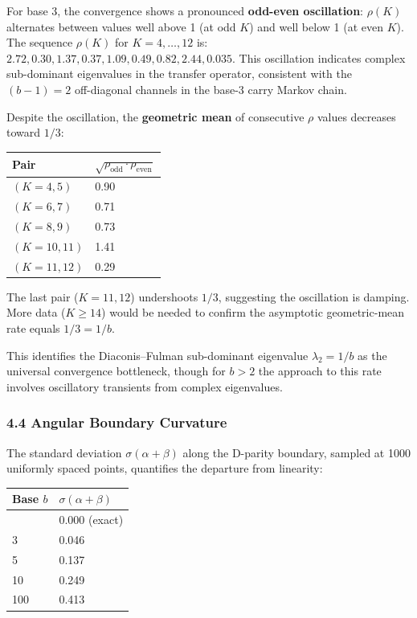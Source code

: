 \documentclass[
  11pt,
]{article}
\begin{document}
For base 3, the convergence shows a pronounced \textbf{odd-even oscillation}:
\(\rho(K)\) alternates between values well above 1 (at odd \(K\)) and well below
1 (at even \(K\)). The sequence \(\rho(K)\) for \(K = 4, \ldots, 12\) is:
\(2.72, 0.30, 1.37, 0.37, 1.09, 0.49, 0.82, 2.44, 0.035\). This oscillation
indicates complex sub-dominant eigenvalues in the transfer operator, consistent
with the \((b-1) = 2\) off-diagonal channels in the base-3 carry Markov chain.

Despite the oscillation, the \textbf{geometric mean} of consecutive \(\rho\)
values decreases toward \(1/3\):

\begin{longtable}[]{@{}ll@{}}
\toprule\noalign{}
Pair & \(\sqrt{\rho_{\text{odd}} \cdot \rho_{\text{even}}}\) \\
\midrule\noalign{}
\endhead
\bottomrule\noalign{}
\endlastfoot
\((K=4,5)\) & 0.90 \\
\((K=6,7)\) & 0.71 \\
\((K=8,9)\) & 0.73 \\
\((K=10,11)\) & 1.41 \\
\((K=11,12)\) & 0.29 \\
\end{longtable}

The last pair (\(K = 11, 12\)) undershoots \(1/3\), suggesting the oscillation
is damping. More data (\(K \geq 14\)) would be needed to confirm the asymptotic
geometric-mean rate equals \(1/3 = 1/b\).

This identifies the Diaconis--Fulman sub-dominant eigenvalue \(\lambda_2 = 1/b\)
as the universal convergence bottleneck, though for \(b > 2\) the approach to
this rate involves oscillatory transients from complex eigenvalues.

\subsubsection{4.4 Angular Boundary Curvature}\label{angular-boundary-curvature}

The standard deviation \(\sigma(\alpha + \beta)\) along the D-parity boundary,
sampled at 1000 uniformly spaced points, quantifies the departure from
linearity:

\begin{longtable}[]{@{}ll@{}}
\toprule\noalign{}
Base \(b\) & \(\sigma(\alpha + \beta)\) \\
\midrule\noalign{}
\endhead
\bottomrule\noalign{}
\endlastfoot
2 & 0.000 (exact) \\
3 & 0.046 \\
5 & 0.137 \\
10 & 0.249 \\
100 & 0.413 \\
\end{longtable}
\end{document}
